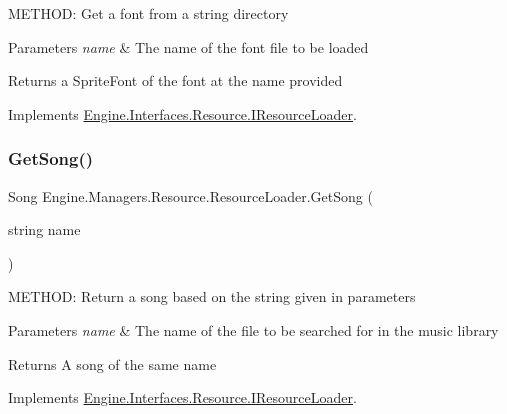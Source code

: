M\+E\+T\+H\+OD\+: Get a font from a string directory 


\begin{DoxyParams}{Parameters}
{\em name} & The name of the font file to be loaded\\
\hline
\end{DoxyParams}
\begin{DoxyReturn}{Returns}
a Sprite\+Font of the font at the name provided
\end{DoxyReturn}


Implements \hyperlink{a00462_abe9339a97b29bce2ba8a77504495f27d}{Engine.\+Interfaces.\+Resource.\+I\+Resource\+Loader}.

\mbox{\label{a00530_a6587452c5637a132330fb0e2f6dc4e7a}} 
\subsubsection{\texorpdfstring{Get\+Song()}{GetSong()}}
{\footnotesize\ttfamily Song Engine.\+Managers.\+Resource.\+Resource\+Loader.\+Get\+Song (\begin{DoxyParamCaption}\item[{string}]{name }\end{DoxyParamCaption})\hspace{0.3cm}{\ttfamily [inline]}}



M\+E\+T\+H\+OD\+: Return a song based on the string given in parameters 


\begin{DoxyParams}{Parameters}
{\em name} & The name of the file to be searched for in the music library\\
\hline
\end{DoxyParams}
\begin{DoxyReturn}{Returns}
A song of the same name
\end{DoxyReturn}


Implements \hyperlink{a00462_a6d962a64dc4f377bdb417598b17c53d0}{Engine.\+Interfaces.\+Resource.\+I\+Resource\+Loader}.

\mbox{\label{a00530_a841de899c3601b3d35496ee798a6e894}} 
